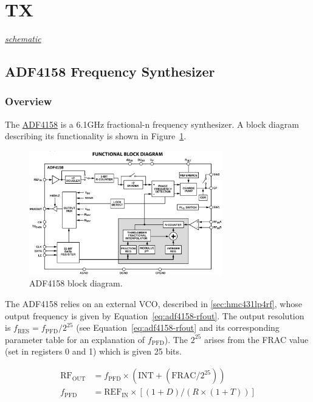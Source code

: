 \section{TX}
\label{sec:tx}
\textit{\hyperlink{schematic.5}{schematic}}

\subsection{ADF4158 Frequency Synthesizer}
\label{sec:adf4158-freq-synth}

\subsubsection{Overview}
\label{sec:adf4158-overview}

The \href{http://www.analog.com/media/en/technical-documentation/data-sheets/ADF4158.pdf}{ADF4158}
is a 6.1GHz fractional-n frequency synthesizer. A block diagram describing its functionality is shown in
Figure~\ref{fig:adf4158-block-diagram}.

\begin{figure}[h]
        \centering
        \includegraphics[width=0.75\textwidth]{data/adf4158-block-diagram.png}
        \caption{ADF4158 block diagram.}
        \label{fig:adf4158-block-diagram}
\end{figure}

The ADF4158 relies on an external VCO, described in \cref{sec:hmc431lp4rf}, whose output frequency
is given by Equation~\ref{eq:adf4158-rfout}. The output resolution is
$f_{\text{RES}} = f_{\text{PFD}}/2^{25}$ (see Equation~\ref{eq:adf4158-rfout} and its corresponding
parameter table for an explanation of $f_{\text{PFD}}$). The $2^{25}$ arises from the FRAC value
(set in registers 0 and 1) which is given 25 bits.

\begin{align}
  \text{RF}_{\text{OUT}} &= f_{\text{PFD}} \times \left(\text{INT} +
                           \left(\text{FRAC}/2^{25}\right)\right) \label{eq:adf4158-rfout} \\
  f_{\text{PFD}} &= \text{REF}_{\text{IN}} \times \left[\left(1 + D\right)/\left(R\times \left(1 +
                   T\right)\right) \right] \nonumber
\end{align}

